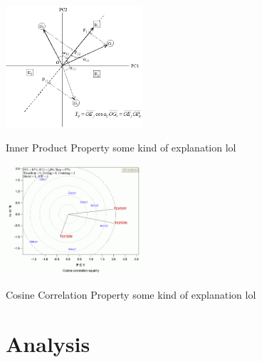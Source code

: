 \documentclass[serif]{beamer}
\begin{document}
\begin{frame}[t]
		{
			\begin{center}
				\includegraphics[width=2.0in]{images/inner_product_property_biplot}
			\end{center}
			
			\begin{block}{Inner Product Property}
				some kind of explanation lol
			\end{block}
		}
		
		{
			\begin{center}
				\includegraphics[width=2.0in]{images/cosine_correlation_property_biplot}	
			\end{center}
			
			\begin{block}{Cosine Correlation Property}
						some kind of explanation lol
			\end{block}
			
		}
		
	\end{frame}
	
	
	\section{Analysis}
	
\end{document}
